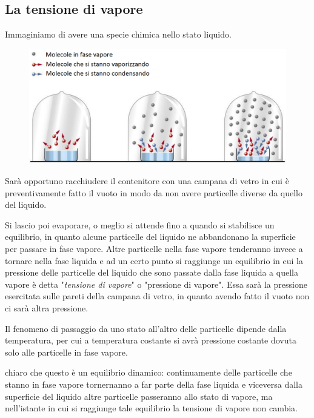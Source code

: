 \subsection{La tensione di vapore}
Immaginiamo di avere una specie chimica nello stato liquido.

\begin{figure}[htp]
    \centering
    \includegraphics[width=15cm]{immagini/campana_di_vetro}
\end{figure}

Sarà opportuno racchiudere il contenitore con una campana di vetro in cui è preventivamente fatto il vuoto in modo da non avere particelle diverse da quello del liquido.

Si lascio poi evaporare, o meglio si attende fino a quando si stabilisce un equilibrio, in quanto alcune particelle del liquido ne abbandonano la superficie per passare in fase vapore. Altre particelle nella fase vapore tenderanno invece a tornare nella fase liquida e ad un certo punto si raggiunge un equilibrio in cui la pressione delle particelle del liquido che sono passate dalla fase liquida a quella vapore è detta "\textit{tensione di vapore}" o "pressione di vapore". Essa sarà la pressione esercitata sulle pareti della campana di vetro, in quanto avendo fatto il vuoto non ci sarà altra pressione.

Il fenomeno di passaggio da uno stato all'altro delle particelle dipende dalla temperatura, per cui a temperatura costante si avrà pressione costante dovuta solo alle particelle in fase vapore.

\vspace{0.2cm}\E chiaro che questo è un equilibrio dinamico: continuamente delle particelle che stanno in fase vapore tornernanno a far parte della fase liquida e viceversa dalla superficie del liquido altre particelle passeranno allo stato di vapore, ma nell'istante in cui si raggiunge tale equilibrio la tensione di vapore non cambia.

